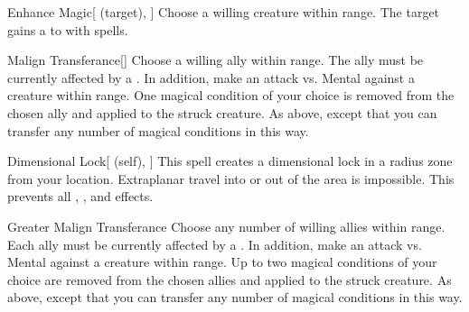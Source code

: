 \lowercase{\hypertarget{spell:Enhance Magic}{}}\label{spell:Enhance Magic}
\begin{ability}[\nth{2}]{\hypertarget{spell:Enhance Magic}{Enhance Magic}}[ (target), ]
Choose a willing creature within \rngmed range.
The target gains a   to  with spells.
\end{ability}
\vspace{0.25em}



\lowercase{\hypertarget{spell:Malign Transferance}{}}\label{spell:Malign Transferance}
\begin{ability}[\nth{2}]{\hypertarget{spell:Malign Transferance}{Malign Transferance}}[]
Choose a willing ally within \rngmed range.
The ally must be currently affected by a  .
In addition, make an attack vs. Mental against a creature within \rngmed range.
\hit One magical condition of your choice is removed from the chosen ally and applied to the struck creature.
\crit As above, except that you can transfer any number of magical conditions in this way.
\end{ability}
\vspace{0.25em}



\lowercase{\hypertarget{spell:Dimensional Lock}{}}\label{spell:Dimensional Lock}
\begin{ability}[\nth{4}]{\hypertarget{spell:Dimensional Lock}{Dimensional Lock}}[ (self), ]
This spell creates a dimensional lock in a \arealarge radius zone from your location.
Extraplanar travel into or out of the area is impossible.
This prevents all , , and  effects.
\end{ability}
\vspace{0.25em}



\lowercase{\hypertarget{spell:Greater Malign Transferance}{}}\label{spell:Greater Malign Transferance}
\begin{ability}[\nth{5}]{\hypertarget{spell:Greater Malign Transferance}{Greater Malign Transferance}}
Choose any number of willing allies within \rngmed range.
Each ally must be currently affected by a  .
In addition, make an attack vs. Mental against a creature within \rngmed range.
\hit Up to two magical conditions of your choice are removed from the chosen allies and applied to the struck creature.
\crit As above, except that you can transfer any number of magical conditions in this way.
\end{ability}
\vspace{0.25em}



